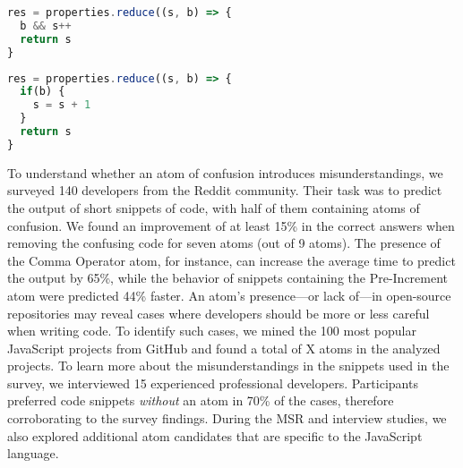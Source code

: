 \begin{figure*}
\noindent\begin{minipage}{.45\textwidth}  
\begin{lstlisting}[language=JavaScript]
res = properties.reduce((s, b) => {
  b && s++
  return s
}
\end{lstlisting}
\end{minipage}\hfill
\begin{minipage}{.45\textwidth}
\begin{lstlisting}[language=JavaScript]
res = properties.reduce((s, b) => {
  if(b) {
    s = s + 1
  }
  return s
}
\end{lstlisting}
\end{minipage}
\label{fig:lst01}
\end{figure*}

To understand whether an atom of confusion introduces misunderstandings, we surveyed 140 developers from the Reddit community. Their task was to predict the output of short snippets of code, with half of them containing atoms of confusion. We found an improvement of at least 15\% in the correct answers when removing the confusing code for seven atoms (out of 9 atoms). The presence of the Comma Operator atom, for instance, can increase the average time to predict the output by 65\%, while the behavior of snippets containing the Pre-Increment atom were predicted 44\% faster.  An atom's presence---or lack of---in open-source repositories may reveal cases where developers should be more or less careful when writing code. To identify such cases, we mined the 100 most popular JavaScript projects from GitHub and found a total of X atoms in the analyzed projects. To learn more about the misunderstandings in the snippets used in the survey, we interviewed 15 experienced professional developers. Participants preferred code snippets \textit{without} an atom in 70\% of the cases, therefore corroborating to the survey findings. During the MSR and interview studies, we also explored additional atom candidates that are specific to the
JavaScript language. 


